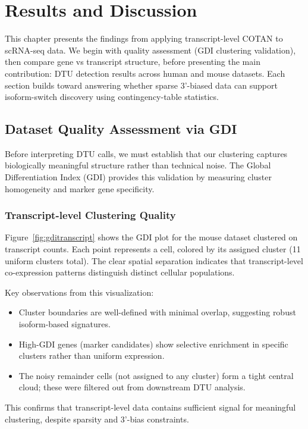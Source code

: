 \chapter{Results and Discussion}

This chapter presents the findings from applying transcript-level COTAN to scRNA-seq data. We begin with quality assessment (GDI clustering validation), then compare gene vs transcript structure, before presenting the main contribution: DTU detection results across human and mouse datasets. Each section builds toward answering whether sparse 3'-biased data can support isoform-switch discovery using contingency-table statistics.

\section{Dataset Quality Assessment via GDI}

Before interpreting DTU calls, we must establish that our clustering captures biologically meaningful structure rather than technical noise. The Global Differentiation Index (GDI) provides this validation by measuring cluster homogeneity and marker gene specificity.

\subsection*{Transcript-level Clustering Quality}\label{sec:gdi-transcript}

Figure~\ref{fig:gditranscript} shows the GDI plot for the mouse dataset clustered on transcript counts. Each point represents a cell, colored by its assigned cluster (11 uniform clusters total). The clear spatial separation indicates that transcript-level co-expression patterns distinguish distinct cellular populations.

Key observations from this visualization:
\begin{itemize}
    \item Cluster boundaries are well-defined with minimal overlap, suggesting robust isoform-based signatures.
    \item High-GDI genes (marker candidates) show selective enrichment in specific clusters rather than uniform expression.
    \item The noisy remainder cells (not assigned to any cluster) form a tight central cloud; these were filtered out from downstream DTU analysis.
\end{itemize}

This confirms that transcript-level data contains sufficient signal for meaningful clustering, despite sparsity and 3'-bias constraints.

